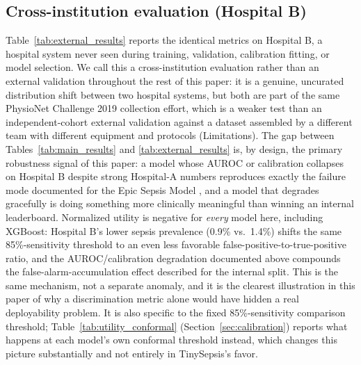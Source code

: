 \documentclass[11pt]{article}
\begin{document}
\subsection{Cross-institution evaluation (Hospital B)}
\label{sec:external}
Table~\ref{tab:external_results} reports the identical metrics on Hospital B, a hospital system never seen during training, validation, calibration fitting, or model selection. We call this a cross-institution evaluation rather than an external validation throughout the rest of this paper: it is a genuine, uncurated distribution shift between two hospital systems, but both are part of the same PhysioNet Challenge 2019 collection effort, which is a weaker test than an independent-cohort external validation against a dataset assembled by a different team with different equipment and protocols (Limitations). The gap between Tables~\ref{tab:main_results} and \ref{tab:external_results} is, by design, the primary robustness signal of this paper: a model whose AUROC or calibration collapses on Hospital B despite strong Hospital-A numbers reproduces exactly the failure mode documented for the Epic Sepsis Model \citep{wong2021external}, and a model that degrades gracefully is doing something more clinically meaningful than winning an internal leaderboard. Normalized utility is negative for \emph{every} model here, including XGBoost: Hospital B's lower sepsis prevalence (0.9\% vs.\ 1.4\%) shifts the same 85\%-sensitivity threshold to an even less favorable false-positive-to-true-positive ratio, and the AUROC/calibration degradation documented above compounds the false-alarm-accumulation effect described for the internal split. This is the same mechanism, not a separate anomaly, and it is the clearest illustration in this paper of why a discrimination metric alone would have hidden a real deployability problem. It is also specific to the fixed 85\%-sensitivity comparison threshold; Table~\ref{tab:utility_conformal} (Section~\ref{sec:calibration}) reports what happens at each model's own conformal threshold instead, which changes this picture substantially and not entirely in TinySepsis's favor.

\begin{table}[t]
\centering
\caption{Cross-institution evaluation on Hospital B (different institution within the same data-collection effort, never used for training, validation, or calibration), 6h-horizon task.}
\label{tab:external_results}

\end{table}
\end{document}
